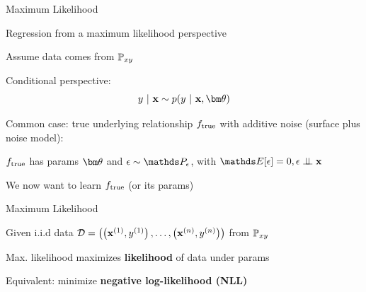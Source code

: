 \documentclass[11pt,compress,t,notes=noshow, xcolor=table]{beamer}
\begin{document}
    

\begin{framei}[sep=M]{Maximum Likelihood}

\item Regression from a maximum likelihood perspective
\item Assume data comes from $\mathbb{P}_{xy}$ 
\item Conditional perspective: 
$$
y~|~ \xv \sim p(y~|~\xv, \thetav)
$$
\item Common case: true underlying relationship $f_{\text{true}}$ with additive noise (surface plus noise model): 

{
}

\item $f_{\text{true}}$ has params $\thetav$ and $\eps \sim\P_\eps$, with $\E[\eps] = 0, \epsilon \perp \!\!\! \perp \xv$
\item We now want to learn $f_{\text{true}}$ (or its params)

\end{framei}


\begin{framei}[sep=M]{Maximum Likelihood}

\item Given i.i.d data $\mathcal{D} = \left( \left(\mathbf{x}^{(1)}, y^{(1)}\right), \ldots, \left(\mathbf{x}^{(n)}, y^{(n)}\right)\right)$ from $\mathbb{P}_{xy}$ 
\item Max. likelihood maximizes \textbf{likelihood} of data under params

{
}

\item Equivalent: minimize \textbf{negative log-likelihood (NLL)}

\splitVCC{
$$ -\loglt = -\sumin \lpdfyigxit $$
}
{
}

\end{framei}
\end{document}
